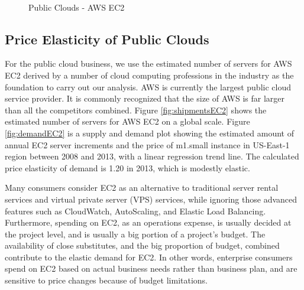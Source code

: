 \documentclass[10pt,journal,cspaper,compsoc]{IEEEtran}
\begin{document}
\begin{figure}[ht!]
 \\
 \caption{Public Clouds - AWS EC2} 
\end{figure}



\subsection{Price Elasticity of Public Clouds}

For the public cloud business, we use the estimated number of servers for AWS EC2 derived by a number of cloud computing professions in the industry as the foundation to carry out our analysis. AWS is currently the largest public cloud service provider. It is commonly recognized that the size of AWS is far larger than all the competitors combined. Figure \ref{fig:shipmentsEC2} shows the estimated number of servers for AWS EC2 on a global scale. Figure \ref{fig:demandEC2} is a supply and demand plot showing the estimated amount of annual EC2 server increments and the price of m1.small instance in US-East-1 region between 2008 and 2013, with a linear regression trend line. The calculated price elasticity of demand is 1.20 in 2013, which is modestly elastic.

Many consumers consider EC2 as an alternative to traditional server rental services and virtual private server (VPS) services, while ignoring those advanced features such as CloudWatch, AutoScaling, and Elastic Load Balancing. Furthermore, spending on EC2, as an operations expense, is usually decided at the project level, and is usually a big portion of a project's budget. The availability of close substitutes, and the big proportion of budget, combined contribute to the elastic demand for EC2. In other words, enterprise consumers spend on EC2 based on actual business needs rather than business plan, and are sensitive to price changes because of budget limitations.
\end{document}
